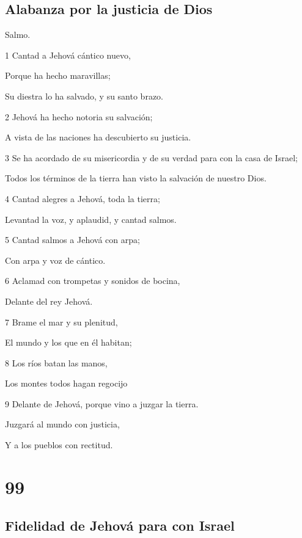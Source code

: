 \section*{Alabanza por la justicia de Dios}

\par Salmo.

\par 1 Cantad a Jehová cántico nuevo,
\par Porque ha hecho maravillas;
\par Su diestra lo ha salvado, y su santo brazo.
\par 2 Jehová ha hecho notoria su salvación;
\par A vista de las naciones ha descubierto su justicia.
\par 3 Se ha acordado de su misericordia y de su verdad para con la casa de Israel;
\par Todos los términos de la tierra han visto la salvación de nuestro Dios.
\par 4 Cantad alegres a Jehová, toda la tierra;
\par Levantad la voz, y aplaudid, y cantad salmos.
\par 5 Cantad salmos a Jehová con arpa;
\par Con arpa y voz de cántico.
\par 6 Aclamad con trompetas y sonidos de bocina,
\par Delante del rey Jehová.
\par 7 Brame el mar y su plenitud,
\par El mundo y los que en él habitan;
\par 8 Los ríos batan las manos,
\par Los montes todos hagan regocijo
\par 9 Delante de Jehová, porque vino a juzgar la tierra.
\par Juzgará al mundo con justicia,
\par Y a los pueblos con rectitud.

\chapter{99}

\section*{Fidelidad de Jehová para con Israel}

